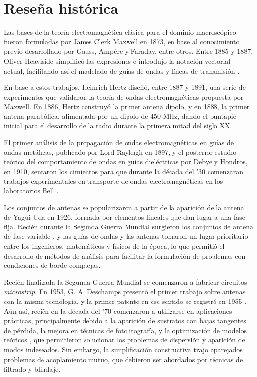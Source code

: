 
\section{Reseña histórica}
\label{sec_intro_resenia}

Las bases de la teoría electromagnética clásica para el dominio macroscópico fueron formuladas por James Clerk Maxwell en 1873, en base al conocimiento previo desarrollado por Gauss, Ampère y Faraday, entre otros. Entre 1885 y 1887, Oliver Heaviside simplificó las expresiones e introdujo la notación vectorial actual, facilitando así el modelado de guías de ondas y líneas de transmisión \cite{Pozar:MwEngineering}.

En base a estos trabajos, Heinrich Hertz diseñó, entre 1887 y 1891, una serie de experimentos que validaron la teoría de ondas electromagnéticas propuesta por Maxwell. En 1886, Hertz construyó la primer antena dipolo, y en 1888, la primer antena parabólica, alimentada por un dipolo de 450 MHz, dando el puntapié inicial para el desarrollo de la radio durante la primera mitad del siglo \textsc{XX}.

El primer análisis de la propagación de ondas electromagnéticas en guías de ondas metálicas, publicado por Lord Rayleigh en 1897, y el posterior estudio teórico del comportamiento de ondas en guías dieléctricas por Debye y Hondros, en 1910, sentaron los cimientos para que durante la década del '30 comenzaran trabajos experimentales en transporte de ondas electromagnéticas en los laboratorios Bell \cite{Collin:GuidedWaves}.

Los conjuntos de antenas se popularizaron a partir de la aparición de la antena de Yagui-Uda en 1926, formada por elementos lineales que dan lugar a una fase fija. Recién durante la Segunda Guerra Mundial surgieron los conjuntos de antena de fase variable \cite{Stutzman:AntennaTheory}, y las guías de ondas y las antenas tomaron un lugar prioritario entre los ingenieros, matemáticos y físicos de la época, lo que permitió el desarrollo de métodos de análisis para facilitar la formulación de problemas con condiciones de borde complejas.

Recién finalizada la Segunda Guerra Mundial se comenzaron a fabricar circuitos \textit{microstrip}. En 1953, G. A. Deschamps presentó el primer trabajo sobre antenas con la misma tecnología, y la primer patente en ese sentido se registró en 1955 \cite{Balanis:Handbook}. Aún así, recién en la década del '70 comenzaron a utilizarse en aplicaciones prácticas, principalmente debido a la aparición de sustratos con bajas tangentes de pérdida, la mejora en técnicas de fotolitografía, y la optimización de modelos teóricos \cite{Barthia:Handbook}, que permitieron solucionar los problemas de dispersión y aparición de modos indeseados. Sin embargo, la simplificación constructiva trajo aparejados problemas de acoplamiento mutuo, que debieron ser abordados por técnicas de filtrado y blindaje.

